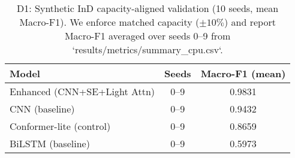 \begin{table}[t]
  \centering
  \caption{D1: Synthetic InD capacity-aligned validation (10 seeds, mean Macro-F1). We enforce matched capacity (\(\pm10\%\)) and report Macro-F1 averaged over seeds 0--9 from `results/metrics/summary_cpu.csv`.}
  \label{tab:d1-synth-ind}
  \begin{tabular}{lcc}
    \toprule
    Model & Seeds & Macro-F1 (mean) \\
    \midrule
    Enhanced (CNN+SE+Light Attn) & 0--9 & 0.9831 \\
    CNN (baseline)               & 0--9 & 0.9432 \\
    Conformer-lite (control)     & 0--9 & 0.8659 \\
    BiLSTM (baseline)            & 0--9 & 0.5973 \\
    \bottomrule
  \end{tabular}
\end{table}

